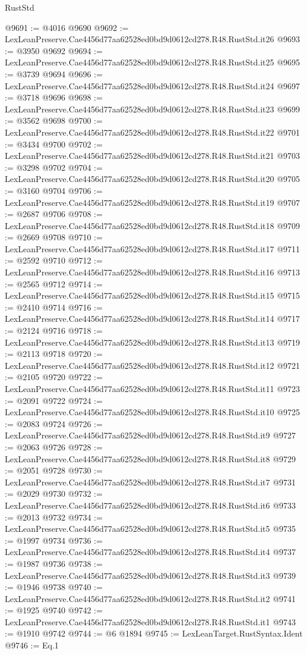 \begin{lexlean}{RustStd}
\begin{coremodule}
@9691 := @4016 @9690
@9692 := LexLeanPreserve.Cae4456d77aa62528ed0bd9d0612cd278.R48.RustStd.it26
@9693 := @3950 @9692
@9694 := LexLeanPreserve.Cae4456d77aa62528ed0bd9d0612cd278.R48.RustStd.it25
@9695 := @3739 @9694
@9696 := LexLeanPreserve.Cae4456d77aa62528ed0bd9d0612cd278.R48.RustStd.it24
@9697 := @3718 @9696
@9698 := LexLeanPreserve.Cae4456d77aa62528ed0bd9d0612cd278.R48.RustStd.it23
@9699 := @3562 @9698
@9700 := LexLeanPreserve.Cae4456d77aa62528ed0bd9d0612cd278.R48.RustStd.it22
@9701 := @3434 @9700
@9702 := LexLeanPreserve.Cae4456d77aa62528ed0bd9d0612cd278.R48.RustStd.it21
@9703 := @3298 @9702
@9704 := LexLeanPreserve.Cae4456d77aa62528ed0bd9d0612cd278.R48.RustStd.it20
@9705 := @3160 @9704
@9706 := LexLeanPreserve.Cae4456d77aa62528ed0bd9d0612cd278.R48.RustStd.it19
@9707 := @2687 @9706
@9708 := LexLeanPreserve.Cae4456d77aa62528ed0bd9d0612cd278.R48.RustStd.it18
@9709 := @2669 @9708
@9710 := LexLeanPreserve.Cae4456d77aa62528ed0bd9d0612cd278.R48.RustStd.it17
@9711 := @2592 @9710
@9712 := LexLeanPreserve.Cae4456d77aa62528ed0bd9d0612cd278.R48.RustStd.it16
@9713 := @2565 @9712
@9714 := LexLeanPreserve.Cae4456d77aa62528ed0bd9d0612cd278.R48.RustStd.it15
@9715 := @2410 @9714
@9716 := LexLeanPreserve.Cae4456d77aa62528ed0bd9d0612cd278.R48.RustStd.it14
@9717 := @2124 @9716
@9718 := LexLeanPreserve.Cae4456d77aa62528ed0bd9d0612cd278.R48.RustStd.it13
@9719 := @2113 @9718
@9720 := LexLeanPreserve.Cae4456d77aa62528ed0bd9d0612cd278.R48.RustStd.it12
@9721 := @2105 @9720
@9722 := LexLeanPreserve.Cae4456d77aa62528ed0bd9d0612cd278.R48.RustStd.it11
@9723 := @2091 @9722
@9724 := LexLeanPreserve.Cae4456d77aa62528ed0bd9d0612cd278.R48.RustStd.it10
@9725 := @2083 @9724
@9726 := LexLeanPreserve.Cae4456d77aa62528ed0bd9d0612cd278.R48.RustStd.it9
@9727 := @2063 @9726
@9728 := LexLeanPreserve.Cae4456d77aa62528ed0bd9d0612cd278.R48.RustStd.it8
@9729 := @2051 @9728
@9730 := LexLeanPreserve.Cae4456d77aa62528ed0bd9d0612cd278.R48.RustStd.it7
@9731 := @2029 @9730
@9732 := LexLeanPreserve.Cae4456d77aa62528ed0bd9d0612cd278.R48.RustStd.it6
@9733 := @2013 @9732
@9734 := LexLeanPreserve.Cae4456d77aa62528ed0bd9d0612cd278.R48.RustStd.it5
@9735 := @1997 @9734
@9736 := LexLeanPreserve.Cae4456d77aa62528ed0bd9d0612cd278.R48.RustStd.it4
@9737 := @1987 @9736
@9738 := LexLeanPreserve.Cae4456d77aa62528ed0bd9d0612cd278.R48.RustStd.it3
@9739 := @1946 @9738
@9740 := LexLeanPreserve.Cae4456d77aa62528ed0bd9d0612cd278.R48.RustStd.it2
@9741 := @1925 @9740
@9742 := LexLeanPreserve.Cae4456d77aa62528ed0bd9d0612cd278.R48.RustStd.it1
@9743 := @1910 @9742
@9744 := @6 @1894
@9745 := LexLeanTarget.RustSyntax.Ident
@9746 := Eq.{1}

\end{coremodule}
\end{lexlean}
